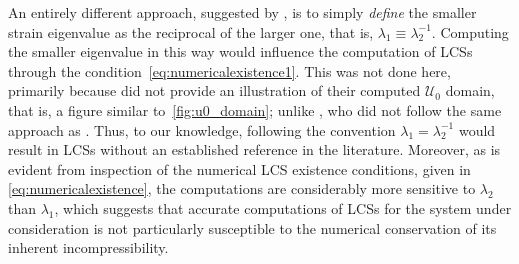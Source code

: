 An entirely different approach, suggested by \textcite{onu2015lcstool}, is to
simply \emph{define} the smaller strain eigenvalue as the reciprocal of the
larger one, that is, $\lambda_{1}\equiv\lambda_{2}^{-1}$. Computing the smaller
eigenvalue in this way would influence the computation of LCSs through
the condition~\eqref{eq:numericalexistence1}. This was not done here,
primarily because \citeauthor{onu2015lcstool} did not provide an illustration
of their computed $\mathcal{U}_{0}$ domain, that is, a figure similar
to~\cref{fig:u0_domain}; unlike \textcite{farazmand2012computing}, who
did not follow the same approach as \citeauthor{onu2015lcstool}. Thus, to our
knowledge, following the convention $\lambda_{1}=\lambda_{2}^{-1}$ would result
in LCSs without an established reference in the literature. Moreover, as is
evident from inspection of the numerical LCS existence conditions, given in
\cref{eq:numericalexistence}, the computations are considerably more sensitive
to $\lambda_{2}$ than $\lambda_{1}$, which suggests that accurate computations
of LCSs for the system under consideration is not particularly susceptible to
the numerical conservation of its inherent incompressibility.
